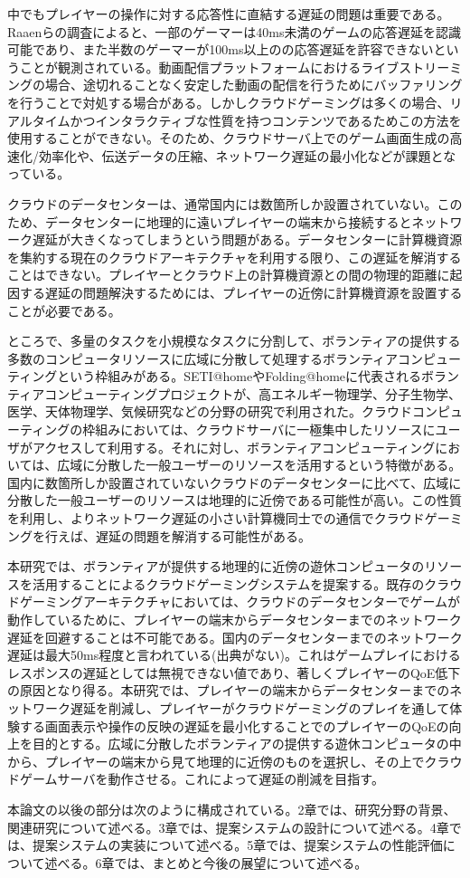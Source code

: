 中でもプレイヤーの操作に対する応答性に直結する遅延の問題は重要である。Raaen\cite{delay}らの調査によると、一部のゲーマーは40ms未満のゲームの応答遅延を認識可能であり、また半数のゲーマーが100ms以上のの応答遅延を許容できないということが観測されている。動画配信プラットフォームにおけるライブストリーミングの場合、途切れることなく安定した動画の配信を行うためにバッファリングを行うことで対処する場合がある。しかしクラウドゲーミングは多くの場合、リアルタイムかつインタラクティブな性質を持つコンテンツであるためこの方法を使用することができない。そのため、クラウドサーバ上でのゲーム画面生成の高速化/効率化や、伝送データの圧縮、ネットワーク遅延の最小化などが課題となっている。

クラウドのデータセンターは、通常国内には数箇所しか設置されていない。このため、データセンターに地理的に遠いプレイヤーの端末から接続するとネットワーク遅延が大きくなってしまうという問題がある。データセンターに計算機資源を集約する現在のクラウドアーキテクチャを利用する限り、この遅延を解消することはできない。プレイヤーとクラウド上の計算機資源との間の物理的距離に起因する遅延の問題解決するためには、プレイヤーの近傍に計算機資源を設置することが必要である。

ところで、多量のタスクを小規模なタスクに分割して、ボランティアの提供する多数のコンピュータリソースに広域に分散して処理するボランティアコンピューティングという枠組みがある。SETI@home\cite{setiathome}やFolding@home\cite{folding}に代表されるボランティアコンピューティングプロジェクトが、高エネルギー物理学、分子生物学、医学、天体物理学、気候研究などの分野の研究で利用された。クラウドコンピューティングの枠組みにおいては、クラウドサーバに一極集中したリソースにユーザがアクセスして利用する。それに対し、ボランティアコンピューティングにおいては、広域に分散した一般ユーザーのリソースを活用するという特徴がある。国内に数箇所しか設置されていないクラウドのデータセンターに比べて、広域に分散した一般ユーザーのリソースは地理的に近傍である可能性が高い。この性質を利用し、よりネットワーク遅延の小さい計算機同士での通信でクラウドゲーミングを行えば、遅延の問題を解消する可能性がある。

本研究では、ボランティアが提供する地理的に近傍の遊休コンピュータのリソースを活用することによるクラウドゲーミングシステムを提案する。既存のクラウドゲーミングアーキテクチャにおいては、クラウドのデータセンターでゲームが動作しているために、プレイヤーの端末からデータセンターまでのネットワーク遅延を回避することは不可能である。国内のデータセンターまでのネットワーク遅延は最大50ms程度と言われている(出典がない)。これはゲームプレイにおけるレスポンスの遅延としては無視できない値であり、著しくプレイヤーのQoE低下の原因となり得る。本研究では、プレイヤーの端末からデータセンターまでのネットワーク遅延を削減し、プレイヤーがクラウドゲーミングのプレイを通して体験する画面表示や操作の反映の遅延を最小化することでのプレイヤーのQoEの向上を目的とする。広域に分散したボランティアの提供する遊休コンピュータの中から、プレイヤーの端末から見て地理的に近傍のものを選択し、その上でクラウドゲームサーバを動作させる。これによって遅延の削減を目指す。

本論文の以後の部分は次のように構成されている。2章では、研究分野の背景、関連研究について述べる。3章では、提案システムの設計について述べる。4章では、提案システムの実装について述べる。5章では、提案システムの性能評価について述べる。6章では、まとめと今後の展望について述べる。







 
